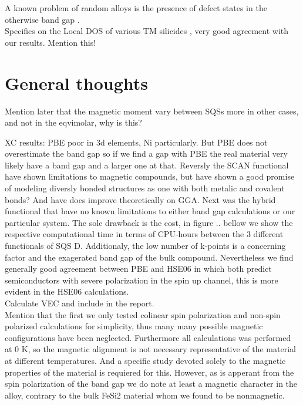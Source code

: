 A known problem of random alloys is the presence of defect states in the otherwise band gap \cite{PhysRevLett.104.236403}.  \\

Specifics on the Local DOS of various TM silicides \cite{lange1997electronic}, very good agreement with our results. Mention this! \\

\section{General thoughts}

Mention later that the magnetic moment vary between SQSs more in other cases, and not in the eqvimolar, why is this? 

XC results: PBE poor in 3d elements, Ni particularly. But PBE does not overestimate the band gap so if we find a gap with PBE the real material very likely have a band gap and a larger one at that. Reversly the SCAN functional have shown limitations to magnetic compounds, but have shown a good promise of modeling diversly bonded structures as one with both metalic and covalent bonds? And have does improve theoretically on GGA. Next was the hybrid functional that have no known limitations to either band gap calculations or our particular system. The sole drawback is the cost, in figure .. bellow we show the respective computational time in terms of CPU-hours between the 3 different functionals of SQS D. Additionaly, the low number of k-points is a concerning factor and the exagerated band gap of the bulk compound. Nevertheless we find generally good agreement between PBE and HSE06 in which both predict semiconductors with severe polarization in the spin up channel, this is more evident in the HSE06 calculations. \\

Calculate VEC and include in the report. \\

Mention that the first we only tested colinear spin polarization and non-spin polarized calculations for simplicity, thus many many possible magnetic configurations have been neglected. Furthermore all calculations was performed at 0 K, so the magnetic alignment is not necessary representative of the material at different temperatures. And a specific study devoted solely to the magnetic properties of the material is requiered for this. However, as is apperant from the spin polarization of the band gap we do note at least a magnetic character in the alloy, contrary to the bulk FeSi2 material whom we found to be nonmagnetic. \\

